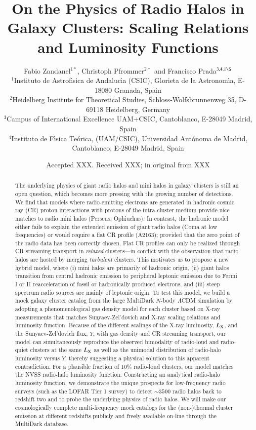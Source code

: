 \documentclass[useAMS,usenatbib]{mn2e}
\title[On the Physics of Radio Halos in Galaxy Clusters]{On the Physics of Radio Halos in Galaxy Clusters: Scaling Relations and Luminosity Functions}
\author[F. Zandanel, C. Pfrommer and F. Prada]{
Fabio Zandanel$^{1 *}$, Christoph Pfrommer$^{2 \dagger}$ and Francisco Prada$^{3,4,1 \S}$\\
$^{1}$Instituto de Astrof\'{\i}sica de Andaluc\'{\i}a (CSIC), Glorieta de la Astronom\'{\i}a, E-18080 Granada, Spain\\
$^{2}$Heidelberg Institute for Theoretical Studies, Schloss-Wolfsbrunnenweg 35, D-69118 Heidelberg, Germany\\
$^{3}$Campus of International Excellence UAM+CSIC, Cantoblanco, E-28049 Madrid, Spain\\
$^{4}$Instituto de F\'{\i}sica Te\'orica, (UAM/CSIC), Universidad Aut\'onoma de Madrid, Cantoblanco, E-28049 Madrid, Spain}
\begin{document}
\date{Accepted XXX. Received XXX; in original from XXX}

\pagerange{\pageref{firstpage}--\pageref{lastpage}} 

\maketitle

\label{firstpage}

\begin{abstract}
  The underlying physics of giant radio halos and mini halos in galaxy clusters
  is still an open question, which becomes more pressing with the growing number
  of detections. We find that models where radio-emitting electrons are
  generated in hadronic cosmic ray (CR) proton interactions with protons of the
  intra-cluster medium provide nice matches to radio mini halos (Perseus,
  Ophiuchus). In contrast, the hadronic model either fails to explain the
  extended emission of giant radio halos (Coma at low frequencies) or would
  require a flat CR profile (A2163); provided that the zero point of the radio
  data has been correctly chosen. Flat CR profiles can only be realized through
  CR streaming transport in {\em relaxed} clusters---in conflict with the
  observation that radio halos are hosted by merging {\em turbulent}
  clusters. This motivates us to propose a new hybrid model, where (i) mini
  halos are primarily of hadronic origin, (ii) giant halos transition from
  central hadronic emission to peripheral leptonic emission due to Fermi I or II
  reacceleration of fossil or hadronically produced electrons, and (iii) steep
  spectrum radio sources are mainly of leptonic origin. To test this model, we
  build a mock galaxy cluster catalog from the large MultiDark $N$-body
  $\Lambda$CDM simulation by adopting a phenomenological gas density model for
  each cluster based on X-ray measurements that matches Sunyaev-Zel'dovich and
  X-ray scaling relations and luminosity function. Because of the different
  scalings of the X-ray luminosity, $L_{{\mathrm{X}}}$, and the Sunyaev-Zel'dovich
  flux, $Y$, with gas density and CR streaming transport, our model can
  simultaneously reproduce the observed bimodality of radio-loud and radio-quiet
  clusters at the same $L_{{\mathrm{X}}}$ as well as the unimodal distribution of
  radio-halo luminosity versus $Y$; thereby suggesting a physical solution to
  this apparent contradiction. For a plausible fraction of 10\% radio-loud
  clusters, our model matches the NVSS radio-halo luminosity
  function. Constructing an analytical radio-halo luminosity function, we
  demonstrate the unique prospects for low-frequency radio surveys (such as the
  LOFAR Tier 1 survey) to detect $\sim3500$ radio halos back to redshift two and
  to probe the underlying physics of radio halos.  We will make our
  cosmologically complete multi-frequency mock catalogs for the (non-)thermal
  cluster emission at different redshifts publicly and freely available on-line
  through the MultiDark database.
\end{abstract}
\end{document}
